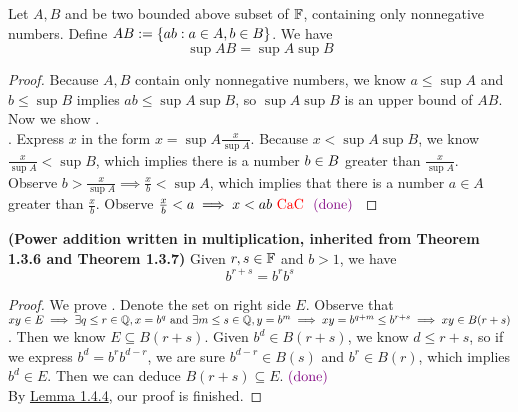\documentclass{report}
\begin{document}
\begin{lemma}
    \label{1.4.4}
Let $A,B$ and be two bounded above subset of  $\mathbb{F}$, containing only nonnegative numbers. Define $AB:=\{ ab:a\in A,b\in B \}$. We have    
\begin{equation}
\sup AB=\sup A \sup B
\end{equation}
\end{lemma}
\begin{proof}
Because $A,B$ contain only nonnegative numbers, we know $a\leq \sup A$ and $b\leq \sup B$ implies $ab\leq \sup A \sup B$, so $\sup A \sup B$ is an upper bound of $AB$. Now we show .\\

. Express $x$ in the form  $x=\sup A \frac{x}{\sup A}$. Because $x<\sup A \sup B$, we know $\frac{x}{\sup A}<\sup B$, which implies there is a number  $b\in B$ greater than $\frac{x}{\sup A}$. Observe $b>\frac{x}{\sup A}\implies \frac{x}{b}<\sup A$, which implies that there is a number $a\in A$ greater than  $\frac{x}{b}$. Observe  $\frac{x}{b}<a\implies x<ab \text{ \textcolor{red}{CaC} }\textcolor{violet}{\text{ (done) }}$  
\end{proof}
\begin{theorem}
\textbf{(Power addition written in multiplication, inherited from Theorem 1.3.6 and Theorem 1.3.7)} Given $r,s\in\mathbb{F}$ and $b>1$, we have
\begin{equation}
  b^{r+s}=b^rb^s
\end{equation}
\end{theorem}
\begin{proof}
We prove . Denote the set on right side $E$. Observe that $xy\in E \implies \exists q\leq r\in\mathbb{Q},x=b^q\text{ and }\exists m\leq s\in\mathbb{Q},y=b^m\implies xy=b^{q+m}\leq b^{r+s}\implies xy\in B(r+s)$. Then we know $E\subseteq B(r+s)$. Given $b^d\in B(r+s)$, we know $d\leq r+s$, so if we express $b^d=b^rb^{d-r}$, we are sure $b^{d-r}\in B(s)$ and $b^r\in B(r)$, which implies $b^d\in E$. Then we can deduce $B(r+s)\subseteq E$.$\textcolor{violet}{\text{ (done) }}$\\

By \hyperref[1.4.4]{Lemma 1.4.4}, our proof is finished.
\end{proof}
\end{document}
